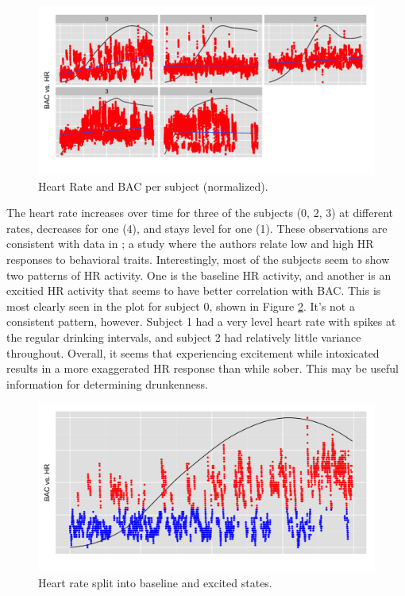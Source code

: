\begin{figure}
	\includegraphics[width=1.0\textwidth]{../figs/heart_rates}
	\caption{Heart Rate and BAC per subject (normalized).}
	\label{fig:heart_rate_facet}
\end{figure}

The heart rate increases over time for three of the subjects (0, 2, 3) at different rates, decreases for one (4), and stays level for one (1). These observations are consistent with data in \cite{Assaad:2006}; a study where the authors relate low and high HR responses to behavioral traits. Interestingly, most of the subjects seem to show two patterns of HR activity. One is the baseline HR activity, and another is an excitied HR activity that seems to have better correlation with BAC. This is most clearly seen in the plot for subject 0, shown in Figure \ref{fig:heart_rate_split}. It's not a consistent pattern, however. Subject 1 had a very level heart rate with spikes at the regular drinking intervals, and subject 2 had relatively little variance throughout. Overall, it seems that experiencing excitement while intoxicated results in a more exaggerated HR response than while sober. This may be useful information for determining drunkenness.

\begin{figure}
	\includegraphics[width=1.0\textwidth]{../figs/heart_rate_split}
	\caption{Heart rate split into baseline and excited states.}
	\label{fig:heart_rate_split}
\end{figure}

